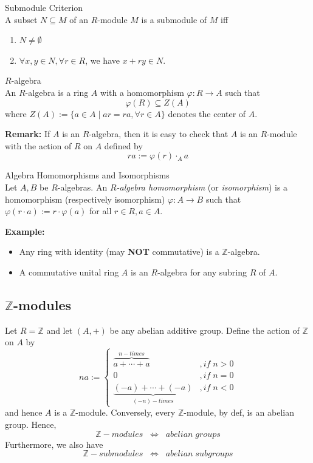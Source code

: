 \begin{proposition}{Submodule Criterion}\\
A subset $N \subseteq M$ of an $R$-module $M$ is a submodule of $M$ iff
\begin{enumerate}
    \item $N \neq \emptyset$
    \item $\forall x,y \in N,\forall r \in R$, we have $x+ry \in N$.
\end{enumerate}
\end{proposition}

\begin{definition}{$R$-algebra}\\
An $R$-algebra is a ring $A$ with a homomorphism $\varphi :R \to A$ such that
$$\varphi (R) \subseteq Z(A)$$
where $Z(A) := \{ a \in A \mid ar=ra ,\forall r \in A \}$ denotes the center of $A$.
\end{definition}

\noindent\textbf{Remark:} If $A$ is an $R$-algebra, then it is easy to check that $A$ is an $R$-module with the action of $R$ on $A$ defined by
$$ra := \varphi(r) \cdot_A a$$

\begin{definition}{Algebra Homomorphisms and Isomorphisms}\\
Let $A,B$ be $R$-algebras. An \textit{$R$-algebra homomorphism} (or \textit{isomorphism}) is a homomorphism (respectively isomorphism) $\varphi :A \to B$ such that $\varphi (r \cdot a) := r \cdot \varphi (a)$ for all $r\in R, a\in A$.
\end{definition}

\noindent\textbf{Example:} \begin{itemize}
    \item Any ring with identity (may \textbf{NOT} commutative) is a $\mathbb{Z}$-algebra.
    \item A commutative unital ring $A$ is an $R$-algebra for any subring $R$ of $A$.
\end{itemize}

\subsection{$\mathbb{Z}$-modules}

Let $R=\mathbb{Z}$ and let $(A,+)$ be any abelian additive group. Define the action of $\mathbb{Z}$ on $A$ by
$$na:= \begin{cases}
    \overbrace{a+ \cdots +a}^{n-times} &,if\;n>0\\
    0 &,if\; n=0\\
    \underbrace{(-a) + \cdots + (-a)}_{(-n)-times} &,if \;n<0
\end{cases}$$
and hence $A$ is a $\mathbb{Z}$-module. Conversely, every $\mathbb{Z}$-module, by def, is an abelian group. Hence,
$$\mathbb{Z} {-}modules \;\;\Leftrightarrow \;\; abelian \;groups$$
Furthermore, we also have
$$\mathbb{Z} {-}submodules \;\;\Leftrightarrow \;\; abelian \;subgroups$$



